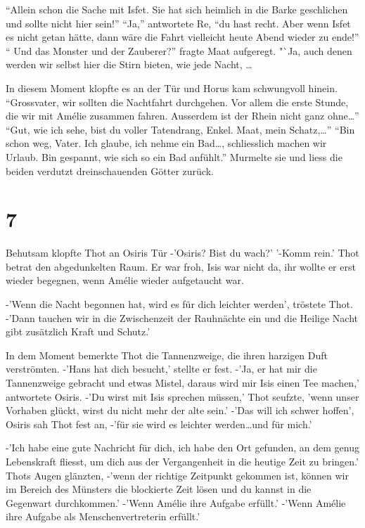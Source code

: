 \documentclass[11pt,titlepage,a5paper]{book}
\begin{document}
  "`Allein schon die Sache mit Isfet. Sie hat sich heimlich in die Barke geschlichen und sollte nicht hier sein!"' "`Ja,"' antwortete Re, "`du hast recht. Aber wenn Isfet es nicht getan hätte, dann wäre die Fahrt vielleicht heute Abend wieder zu ende!"' "` Und das Monster und der Zauberer?"' fragte Maat aufgeregt. "`Ja, auch denen werden wir selbst hier die Stirn bieten, wie jede Nacht, \dots

In diesem Moment klopfte es an der Tür und Horus kam schwungvoll hinein. "`Grossvater, wir sollten die Nachtfahrt durchgehen. Vor allem die erste Stunde, die wir mit Amélie zusammen fahren. Ausserdem ist der Rhein nicht ganz ohne\dots"' "`Gut, wie ich sehe, bist du voller Tatendrang, Enkel.  Maat, mein Schatz,\dots"' "`Bin schon weg, Vater. Ich glaube, ich nehme ein Bad\dots, schliesslich machen wir Urlaub. Bin gespannt, wie sich so ein Bad anfühlt."' Murmelte sie und liess die beiden verdutzt dreinschauenden Götter zurück. 

\section*{7}


Behutsam klopfte Thot an Osiris Tür -'Osiris? Bist du wach?' '-Komm rein.' Thot betrat den abgedunkelten Raum. Er war froh, Isis war nicht da, ihr wollte er erst wieder begegnen, wenn Amélie wieder aufgetaucht war.

-'Wenn die Nacht begonnen hat, wird es für dich leichter werden', tröstete Thot. -'Dann tauchen wir in die Zwischenzeit der Rauhnächte ein und die Heilige Nacht gibt zusätzlich Kraft und Schutz.'

In dem Moment bemerkte Thot die Tannenzweige, die ihren harzigen Duft verströmten. -'Hans hat dich besucht,' stellte er fest. -'Ja, er hat mir die Tannenzweige gebracht und etwas Mistel, daraus wird mir Isis einen Tee machen,' antwortete Osiris. -'Du wirst mit Isis sprechen müssen,' Thot seufzte, 'wenn unser Vorhaben glückt, wirst du nicht mehr der alte sein.' -'Das will ich schwer hoffen', Osiris sah Thot fest an, -'für sie wird es leichter werden\dots und für mich.' 

-'Ich habe eine gute Nachricht für dich, ich habe den Ort gefunden, an dem genug Lebenskraft fliesst, um dich aus der Vergangenheit in die heutige Zeit zu bringen.' Thots Augen glänzten, -'wenn der richtige Zeitpunkt gekommen ist, können wir im Bereich des Münsters die blockierte Zeit lösen und du kannst in die Gegenwart durchkommen.' -'Wenn Amélie ihre Aufgabe erfüllt.' -'Wenn Amélie ihre Aufgabe als Menschenvertreterin erfüllt.'
\end{document}
